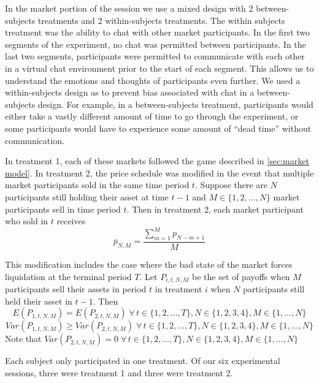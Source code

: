 \documentclass[11pt]{article}
\begin{document}


In the market portion of the session we use a mixed design with 2 between-subjects treatments and 2 within-subjects treatments. The within subjects treatment was the ability to chat with other market participants. In the first two segments of the experiment, no chat was permitted between participants. In the last two segments, participants were permitted to communicate with each other in a virtual chat environment prior to the start of each segment. This allows us to understand the emotions and thoughts of participants even further. We used a within-subjects design as to prevent bias associated with chat in a between-subjects design. For example, in a between-subjects treatment, participants would either take a vastly different amount of time to go through the experiment, or some participants would have to experience some amount of ``dead time'' without communication.

In treatment 1, each of these markets followed the game described in \ref{sec:market model}. In treatment 2, the price schedule was modified in the event that multiple market participants sold in the same time period $t$. Suppose there are $N$ participants still holding their asset at time $t-1$ and $M \in \{1,2,...,N\}$ market participants sell in time period $t$. Then in treatment 2, each market participant who sold in $t$ receives \begin{equation}
    \bar{p}_{N,M} = \dfrac{\sum_{m=1}^M p_{N-m+1}}{M}
\end{equation}

This modification includes the case where the bad state of the market forces liquidation at the terminal period $T$. Let $P_{i,t,N,M}$ be the set of payoffs when $M$ participants sell their assets in period $t$ in treatment $i$ when $N$ participants still held their asset in $t-1$. Then
\begin{equation}
    E(P_{1,t,N,M}) = E(P_{2,t,N,M}) \; \forall \, t\in\{1,2,...,T\}, N \in \{1,2,3,4\},M \in \{1,...,N\}
\end{equation}
\begin{equation}
    Var(P_{1,t,N,M}) \ge Var(P_{2,t,N,M}) \; \forall \, t\in\{1,2,...,T\}, N \in \{1,2,3,4\},M \in \{1,...,N\}
\end{equation}
Note that $Var(P_{2,t,N,M}) = 0 \; \forall \, t\in\{1,2,...,T\}, N \in \{1,2,3,4\},M \in \{1,...,N\}$

Each subject only participated in one treatment. Of our six experimental sessions, three were treatment 1 and three were treatment 2.
\end{document}
